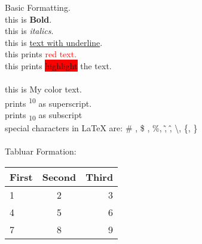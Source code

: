 \documentclass[landscape]{slides}
\begin{document}
Basic Formatting.
\\
this is \textbf{Bold}.\\
this is \textit{italics}.\\
this is \underline{text with underline}.\\
this prints \textcolor{red}{red text.}\\
this prints \colorbox{red}{highlight} the text.\\
\\
this is \textcolor{mycolor}{My color} text.\\
prints \textsuperscript{10} as superscript.\\
prints \textsubscript{10} as subscript\\
special characters in LaTeX are: \# , \$ , \%, \~, \^, \textbackslash, \{, \} \\ \\
Tabluar Formation:\\
\begin{tabular}{|| l | c | r ||}
	First & Second & Third\\
\hline
	1 & 2 & 3 \\
	4 & 5 & 6 \\
	7 & 8 &9 \\
\hline
\end{tabular} 
\end{document}
